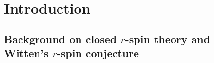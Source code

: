 \documentclass[11pt]{amsart}
\theoremstyle{definition}
\theoremstyle{remark}
\newcommand{\<}{\left<}
\renewcommand{\>}{\right>}
\numberwithin{equation}{section}
\begin{document}
\begin{abstract}
We %
prove that the open $g=1$ potential equals, after a coordinate change, to the $g=1$ part of the Gelfand--Dikii wave function, thus confirming a conjecture %
of \cite{BCT3}.
We %
also prove that our $g=1$ intersection numbers satisfy a $g=1$ recursion, also %
predicted in \cite{BCT3,gomez2021open}. This %
recursion is the $g=1$ analogue of Solomon's famous $g=0$ Open WDVV equation \cite{sol_owdvv}, with descendents, and is also the universal $g=1$ recursion for $F$-Cohomological field theories \cite{alexandrov2023construction}.
Again, this is first geometric construction which is not the $g=1$ sector %
of \cite{PST14,Tes15} proven %
to satisfy this universal %
recursion.
\end{abstract}

\maketitle

\setcounter{tocdepth}{1}
\tableofcontents

\section{Introduction}\label{sec intro}
\subsection{Background on closed $r$-spin theory and Witten's $r$-spin conjecture}
\end{document}
